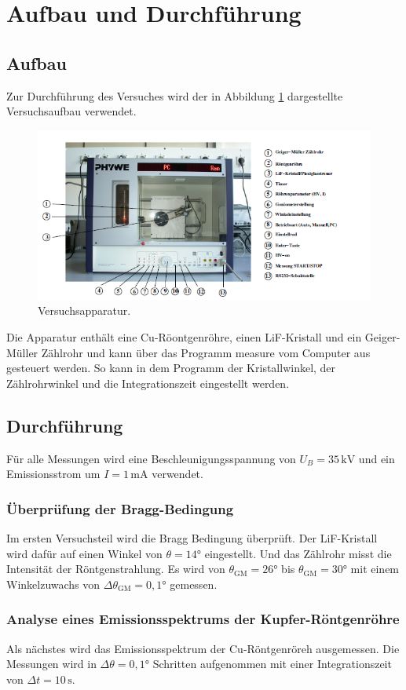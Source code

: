 \section{Aufbau und Durchführung}
\subsection{Aufbau}
Zur Durchführung des Versuches wird der in Abbildung \ref{fig:Aufbau} dargestellte Versuchsaufbau
verwendet.
\begin{figure}[H]
    \centering
    \includegraphics{Aufbau.png}
    \caption{Versuchsapparatur.}
    \label{fig:Aufbau}
\end{figure}
Die Apparatur enthält eine Cu-Röontgenröhre, einen LiF-Kristall und ein Geiger-Müller
Zählrohr und kann über das Programm measure vom Computer aus gesteuert werden.
So kann in dem Programm der Kristallwinkel, der Zählrohrwinkel und die Integrationszeit
eingestellt werden.
\subsection{Durchführung}
Für alle Messungen wird eine Beschleunigungsspannung von $U_B = 35\,\mathrm{kV}$ 
und ein Emissionsstrom um $I=1\,\mathrm{mA}$ verwendet.
\subsubsection{Überprüfung der Bragg-Bedingung}
Im ersten Versuchsteil wird die Bragg Bedingung überprüft. Der LiF-Kristall wird dafür
auf einen Winkel von $\theta=14°$ eingestellt. Und das Zählrohr misst die Intensität der
Röntgenstrahlung. Es wird von $\theta_\text{GM} =26°$ bis $\theta_\text{GM}=30°$ mit einem Winkelzuwachs von
$\Delta \theta_\text{GM} = 0,1°$ gemessen.
\subsubsection{Analyse eines Emissionsspektrums der Kupfer-Röntgenröhre}
Als nächstes wird das Emissionsspektrum der Cu-Röntgenröreh ausgemessen. Die Messungen
wird in $\Delta \theta = 0,1°$ Schritten aufgenommen mit einer Integrationszeit von $\Delta t =10\,\mathrm{s}$.
